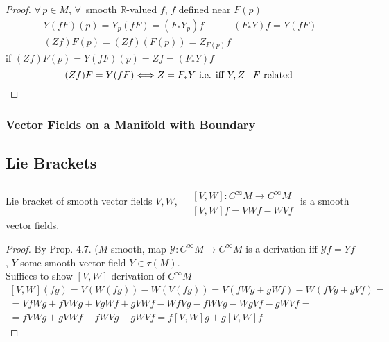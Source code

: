 \begin{proof}
  $\forall \, p \in M$, $\forall \, $ smooth $\mathbb{R}$-valued $f$, $f$ defined near $F(p)$
\[
\begin{gathered}
  Y(fF)(p) = Y_p(fF) = (F_* Y_p)f \quad \quad \quad (F_*Y)f = Y(fF) \\ 
  (Zf)F(p) = (Zf)(F(p)) = Z_{F(p)}f  
\end{gathered}
\]
if $(Zf) F(p) = Y(fF)(p) = Zf = (F_*Y) f $ 
\[
(Zf)F = Y(fF) \Longleftrightarrow Z = F_* Y \text{ i.e. iff $Y, Z$ \, $F$-related }
\] 

\end{proof}



\subsubsection*{ Vector Fields on a Manifold with Boundary}

\subsection*{ Lie Brackets }

\begin{lemma}[4.12] Lie bracket of smooth vector fields $V,W$, $\begin{aligned} & \quad \\
    & [V, W ] : C^{\infty} M \to C^{\infty} M \\ 
    & [V, W ] f = VW f - WV f \end{aligned}$ \quad is a smooth vector fields.  
\end{lemma}

\begin{proof}
  By Prop. 4.7.  ($M$ smooth, map $\mathcal{Y} : C^{\infty}M \to C^{\infty} M$ is a derivation iff $\mathcal{Y} f = Yf$, $Y$ some smooth vector field $Y \in \tau(M)$.  \\
Suffices to show $[V,W]$ derivation of $C^{\infty}M$  
\[
\begin{gathered}
  [V,W] (fg) = V(W(fg)) -  W(V(fg)) = V(fWg + gWf) - W( fVg  + gVf) = \\
   = VfWg + fVW g + Vg Wf + gVWf - WfVg - fWVg - WgVf - gWVf  = \\
   =fVWg + gVWf - fWV g - gWVf = f[V,W] g + g[V,W]f
\end{gathered}
\]
\end{proof}


